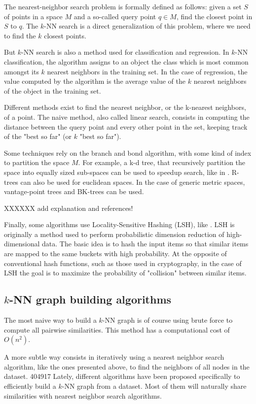 \documentclass[wcp]{jmlr}
\begin{document}
The nearest-neighbor search problem is formally defined as follows: given a set $S$ of points in a space $M$ and a so-called query point $q \in M$, find the closest point in $S$ to $q$. The $k$-NN search is a direct generalization of this problem, where we need to find the $k$ closest points.

But $k$-NN search is also a method used for classification and regression. In $k$-NN classification, the algorithm assigns to an object the class which is most common amongst its $k$ nearest neighbors in the training set. In the case of regression, the value computed by the algorithm is the average value of the $k$ nearest neighbors of the object in the training set.

Different methods exist to find the nearest neighbor, or the k-nearest neighbors, of a point. The naive method, also called linear search, consists in computing the distance between the query point and every other point in the set, keeping track of the "best so far" (or $k$ "best so far").

Some techniques rely on the branch and bond algorithm, with some kind of index to partition the space $M$. For example, a k-d tree, that recursively partition the space into equally sized sub-spaces can be used to speedup search, like in \cite{Moore1991}. R-trees can also be used for euclidean spaces. In the case of generic metric spaces, vantage-point trees and BK-trees can be used.

XXXXXX add explanation and references!

Finally, some algorithms use Locality-Sensitive Hashing (LSH), like \cite{Rajaraman2010}. LSH is originally a method used to perform probabilistic dimension reduction of high-dimensional data. The basic idea is to hash the input items so that similar items are mapped to the same buckets with high probability. At the opposite of conventional hash functions, such as those used in cryptography, in the case of LSH the goal is to maximize the probability of "collision" between similar items.

\subsection{$k$-NN graph building algorithms}

The most naive way to build a $k$-NN graph is of course using brute force to compute all pairwise similarities. This method has a computational cost of $O(n^2)$.

A more subtle way consists in iteratively using a nearest neighbor search algorithm, like the ones presented above, to find the neighbors of all nodes in the dataset.
404917
Lately, different algorithms have been proposed specifically to efficiently build a $k$-NN graph from a dataset. Most of them will naturally share similarities with nearest neighbor search algorithms.
\end{document}
